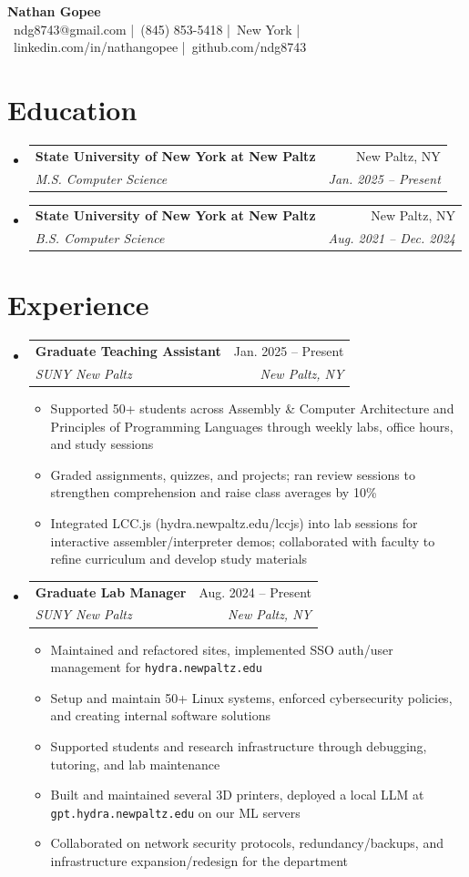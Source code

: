 \documentclass[letterpaper,11pt]{article}
\makeatletter
\newcommand{\resumeItem}[1]{\item\scriptsize{#1}}
\newcommand{\resumeSubheading}[4]{
  \vspace{-2pt}\item
  \begin{tabular*}{0.97\textwidth}[t]{l@{\extracolsep{\fill}}r}
    \textbf{#1} & #2 \\
    \textit{#3} & \textit{#4} \\
  \end{tabular*}\vspace{-2pt}
}
\newcommand{\resumeSubHeadingListStart}{\begin{itemize}[label={},parsep=0pt]}
\newcommand{\resumeSubHeadingListEnd}{\end{itemize}}
\makeatother
\begin{document}
\begin{center}\vspace{-6pt}
  {\Huge\bfseries Nathan Gopee}\\
  {\scriptsize\faEnvelope\ ndg8743@gmail.com \quad|\quad\faPhone*\ (845) 853-5418 \quad|\quad\faMapMarker*\ New York \quad|\quad\faLinkedin\ linkedin.com/in/nathangopee \quad|\quad\faGithub\ github.com/ndg8743}\\[ -6pt]
\end{center}

\section{Education}
\resumeSubHeadingListStart
  \resumeSubheading{State University of New York at New Paltz}{New Paltz, NY}{M.S. Computer Science}{Jan. 2025 -- Present}
  \resumeSubheading{State University of New York at New Paltz}{New Paltz, NY}{B.S. Computer Science}{Aug. 2021 -- Dec. 2024}
\resumeSubHeadingListEnd

\vspace{-8pt}
\section{Experience}
\resumeSubHeadingListStart
  \resumeSubheading{Graduate Teaching Assistant}{Jan. 2025 -- Present}{SUNY New Paltz}{New Paltz, NY}
    \begin{itemize}
      \resumeItem{Supported 50+ students across Assembly \& Computer Architecture and Principles of Programming Languages through weekly labs, office hours, and study sessions}
      \resumeItem{Graded assignments, quizzes, and projects; ran review sessions to strengthen comprehension and raise class averages by 10\%}
      \resumeItem{Integrated LCC.js (hydra.newpaltz.edu/lccjs) into lab sessions for interactive assembler/interpreter demos; collaborated with faculty to refine curriculum and develop study materials}
    \end{itemize}


  \resumeSubheading{Graduate Lab Manager}{Aug. 2024 -- Present}{SUNY New Paltz}{New Paltz, NY}
    \begin{itemize}
      \resumeItem{Maintained and refactored sites, implemented SSO auth/user management for \texttt{hydra.newpaltz.edu}}
      \resumeItem{Setup and maintain 50+ Linux systems, enforced cybersecurity policies, and creating internal software solutions}
      \resumeItem{Supported students and research infrastructure through debugging, tutoring, and lab maintenance}
      \resumeItem{Built and maintained several 3D printers, deployed a local LLM at \texttt{gpt.hydra.newpaltz.edu} on our ML servers}
      \resumeItem{Collaborated on network security protocols, redundancy/backups, and infrastructure expansion/redesign for the department}
    \end{itemize}
\resumeSubHeadingListEnd
\end{document}
